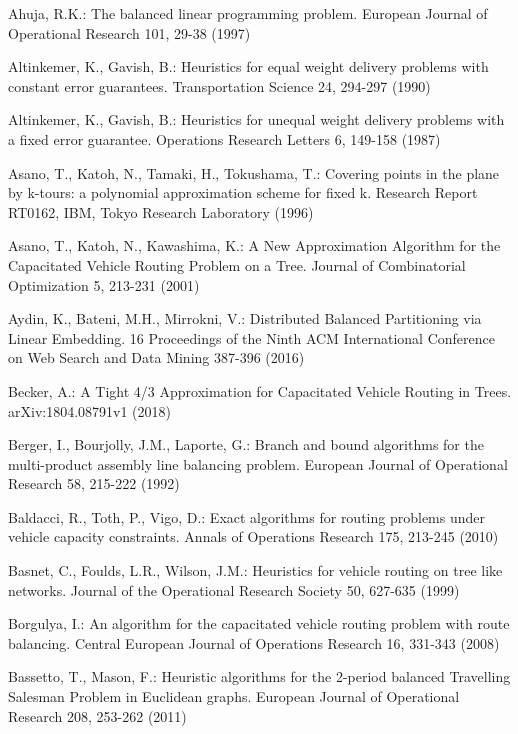 \begin{thebibliography}{}
 
 Ahuja, R.K.: The balanced linear programming problem. European Journal of Operational Research 101, 29-38 (1997)

 Altinkemer, K., Gavish, B.: Heuristics for equal weight delivery problems with constant error guarantees. Transportation Science 24, 294-297 (1990) 

 Altinkemer, K., Gavish, B.: Heuristics for unequal weight delivery problems with a fixed error guarantee. Operations Research Letters 6, 149-158 (1987)

  Asano, T., Katoh, N., Tamaki, H., Tokushama, T.: Covering points in the plane by k-tours: a polynomial approximation scheme for fixed k. Research Report RT0162, IBM, Tokyo Research Laboratory (1996)

 Asano, T., Katoh, N., Kawashima, K.: A New Approximation Algorithm for the Capacitated Vehicle Routing Problem on a Tree. Journal of Combinatorial Optimization  5, 213-231 (2001)

 Aydin, K., Bateni, M.H., Mirrokni, V.: Distributed Balanced Partitioning via Linear Embedding. 16 Proceedings of the Ninth ACM International Conference on Web Search and Data Mining 387-396 (2016)

  Becker, A.: A Tight 4/3 Approximation for Capacitated Vehicle Routing in Trees. arXiv:1804.08791v1 (2018)

 Berger, I., Bourjolly, J.M., Laporte, G.: Branch and bound algorithms for the multi-product assembly line balancing problem. European Journal of Operational Research 58, 215-222 (1992)

 Baldacci, R., Toth, P., Vigo, D.: Exact algorithms for routing problems under vehicle capacity constraints. Annals of Operations Research 175, 213-245 (2010)
  
 Basnet, C., Foulds, L.R., Wilson, J.M.: Heuristics for vehicle routing on tree like networks. Journal of the Operational Research Society 50, 627-635 (1999)

 Borgulya, I.: An algorithm for the capacitated vehicle routing problem with route balancing. Central European Journal of Operations Research 16, 331-343 (2008) 

 Bassetto, T., Mason, F.: Heuristic algorithms for the 2-period balanced Travelling Salesman Problem in Euclidean graphs. European Journal of Operational Research 208, 253-262 (2011)


\end{thebibliography}
